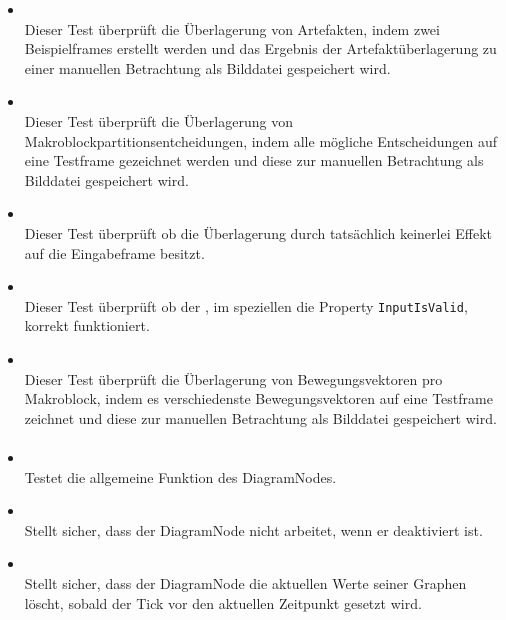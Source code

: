 \begin{itemize}

\item{}~\\
Dieser Test überprüft die Überlagerung von Artefakten, indem zwei Beispielframes erstellt werden und das Ergebnis der Artefaktüberlagerung zu einer manuellen Betrachtung als Bilddatei gespeichert wird.

\item{}~\\
Dieser Test überprüft die Überlagerung von Makroblockpartitionsentcheidungen, indem alle mögliche Entscheidungen auf eine Testframe gezeichnet werden und diese zur manuellen Betrachtung als Bilddatei gespeichert wird.

\item{}~\\
Dieser Test überprüft ob die Überlagerung durch  tatsächlich keinerlei Effekt auf die Eingabeframe besitzt.

\item{}~\\
Dieser Test überprüft ob der , im speziellen die Property \verb#InputIsValid#, korrekt funktioniert.

\item{}~\\
Dieser Test überprüft die Überlagerung von Bewegungsvektoren pro Makroblock, indem es verschiedenste Bewegungsvektoren auf eine Testframe zeichnet und diese zur manuellen Betrachtung als Bilddatei gespeichert wird.

\end{itemize}

\paragraph{}
\begin{itemize}
	\item{} \\
		Testet die allgemeine Funktion des DiagramNodes.
	\item{} \\
		Stellt sicher, dass der DiagramNode nicht arbeitet, wenn er deaktiviert ist.
	
	\item{} \\
		Stellt sicher, dass der DiagramNode die aktuellen Werte seiner Graphen löscht, sobald der Tick vor den aktuellen Zeitpunkt gesetzt wird.
\end{itemize}


